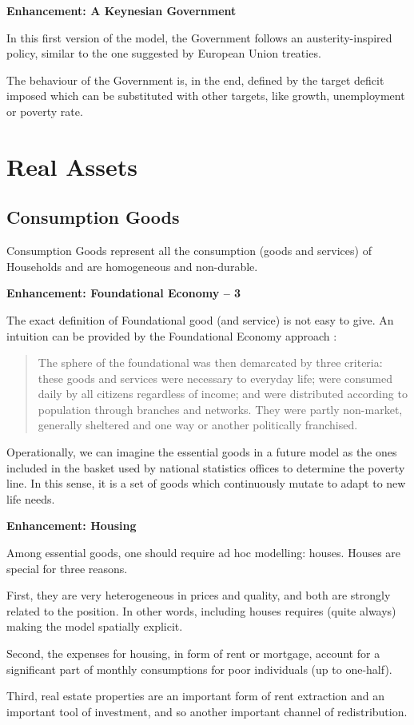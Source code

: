 \documentclass[a4paper, headings=standardclasses]{scrartcl}
\newenvironment{enh}[1][]{\begin{framed}\noindent\textbf{Enhancement: #1}\par}{\end{framed}}
\begin{document}
\begin{enh}[A Keynesian Government]
    In this first version of the model, the Government follows an austerity-inspired policy, similar to the one suggested by European Union treaties.

    The behaviour of the Government is, in the end, defined by the target deficit imposed which can be substituted with other targets, like growth, unemployment or poverty rate.
\end{enh}

\section{Real Assets}
\subsection{Consumption Goods}
Consumption Goods represent all the consumption (goods and services) of Households and are homogeneous and non-durable.

\begin{enh}[Foundational Economy -- 3]
    The exact definition of Foundational good (and service) is not easy to give. An intuition can be provided by the Foundational Economy approach \parencite{arcidiacono2018}: \begin{quote}
        The sphere of the foundational was then demarcated by three criteria: these goods and services were necessary to everyday life; were consumed daily by all citizens regardless of income; and were distributed according to population through branches and networks. They were partly non-market, generally sheltered and one way or another politically franchised.
    \end{quote}

    Operationally, we can imagine the essential goods in a future model as the ones included in the basket used by national statistics offices to determine the poverty line. In this sense, it is a set of goods which continuously mutate to adapt to new life needs.
\end{enh}

\begin{enh}[Housing]
    Among essential goods, one should require ad hoc modelling: houses. Houses are special for three reasons.

    First, they are very heterogeneous in prices and quality, and both are strongly related to the position. In other words, including houses requires (quite always) making the model spatially explicit.

    Second, the expenses for housing, in form of rent or mortgage, account for a significant part of monthly consumptions for poor individuals (up to one-half).

    Third, real estate properties are an important form of rent extraction and an important tool of investment, and so another important channel of redistribution.
\end{enh}
\end{document}

